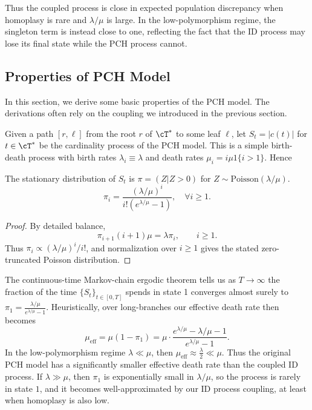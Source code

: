 Thus the coupled process is close in expected population discrepancy when
homoplasy is rare and $\lambda/\mu$ is large. In the low-polymorphism regime,
the singleton term is instead close to one, reflecting the fact that the ID
process may lose its final state while the PCH process cannot.

\subsection{Properties of PCH Model}

In this section, we derive some basic properties of the PCH model. The derivations often rely on the
coupling we introduced in the previous section.

Given a path $[r, \ell]$ from the root $r$ of $\cT^*$ to some leaf $\ell$, let $S_t = |c(t)|$ for $t \in \cT^*$ be the cardinality
process of the PCH model. This is a simple birth-death process with birth rates
$\lambda_i \equiv \lambda$ and death rates $\mu_i = i\mu 1\{i > 1\}$. Hence

\begin{lemma}\label{lem:stationary_dist_state_cardinality_process}
    The stationary distribution of $S_t$ is $ \pi = (Z | Z > 0)$ for $Z \sim \mathrm{Poisson}(\lambda/\mu)$.
    \[\pi_i = \frac{(\lambda/\mu)^i}{i!(e^{\lambda/\mu}-1)}, \quad \forall i \geq 1.\]
\end{lemma}

\begin{proof}
    By detailed balance,
    \[\pi_{i+1}(i+1)\mu=\lambda\pi_i,\qquad i\geq1.\]
    \noindent Thus $\pi_i\propto(\lambda/\mu)^i/i!$, and normalization over $i\geq1$
    gives the stated zero-truncated Poisson distribution.
\end{proof}

\noindent The continuous-time Markov-chain ergodic theorem \cite[Section~20.3]{meyn2009_markov_chains_stochastic_stability} tells us as $T \to \infty$ the fraction of the time $\{S_t\}_{t \in [0,T]}$ spends in state 1
converges almost surely to $\pi_1 = \frac{\lambda / \mu}{e^{\lambda / \mu}-1}$. Heuristically, over long-branches our effective death rate then becomes
%
\[\mu_{\text{eff}} = \mu \left(1-\pi_1\right) = \mu \cdot \frac{e^{\lambda / \mu}-\lambda/\mu-1}{e^{\lambda / \mu}-1}.\]
%
\noindent In the low-polymorphism regime $\lambda \ll \mu$, then $\mu_{\text{eff}} \approx \frac{\lambda}{2} \ll \mu$. Thus
the original PCH model has a significantly smaller effective death rate than the coupled ID process.
If $\lambda \gg \mu$, then $\pi_1$ is exponentially small in $\lambda/\mu$, so the
process is rarely in state $1$, and it becomes well-approximated by our
ID process coupling, at least when homoplasy is also low.


